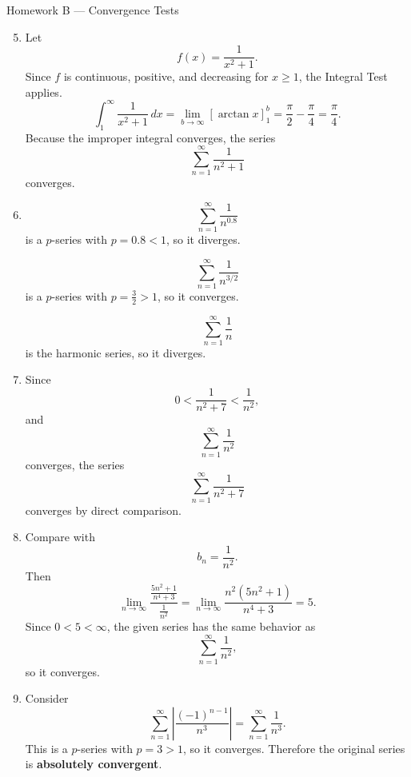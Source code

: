 \documentclass[11pt]{article}
\begin{document}
\begin{theorybox}{Homework B --- Convergence Tests}
\begin{enumerate}
\setcounter{enumi}{4}
    \item
    Let
    \[
    f(x)=\frac{1}{x^2+1}.
    \]
    Since \(f\) is continuous, positive, and decreasing for \(x\ge 1\), the Integral Test applies.
    \[
    \int_1^{\infty}\frac{1}{x^2+1}\,dx
    =
    \lim_{b\to\infty}[\arctan x]_1^b
    =
    \frac{\pi}{2}-\frac{\pi}{4}
    =
    \frac{\pi}{4}.
    \]
    Because the improper integral converges, the series
    \[
    \sum_{n=1}^{\infty}\frac{1}{n^2+1}
    \]
    converges.

    \item
    \[
    \sum_{n=1}^{\infty}\frac{1}{n^{0.8}}
    \]
    is a \(p\)-series with \(p=0.8<1\), so it diverges.

    \[
    \sum_{n=1}^{\infty}\frac{1}{n^{3/2}}
    \]
    is a \(p\)-series with \(p=\frac32>1\), so it converges.

    \[
    \sum_{n=1}^{\infty}\frac{1}{n}
    \]
    is the harmonic series, so it diverges.

    \item
    Since
    \[
    0<\frac{1}{n^2+7}<\frac{1}{n^2},
    \]
    and
    \[
    \sum_{n=1}^{\infty}\frac{1}{n^2}
    \]
    converges, the series
    \[
    \sum_{n=1}^{\infty}\frac{1}{n^2+7}
    \]
    converges by direct comparison.

    \item
    Compare with
    \[
    b_n=\frac{1}{n^2}.
    \]
    Then
    \[
    \lim_{n\to\infty}
    \frac{\frac{5n^2+1}{n^4+3}}{\frac{1}{n^2}}
    =
    \lim_{n\to\infty}\frac{n^2(5n^2+1)}{n^4+3}
    =
    5.
    \]
    Since \(0<5<\infty\), the given series has the same behavior as
    \[
    \sum_{n=1}^{\infty}\frac{1}{n^2},
    \]
    so it converges.

    \item
    Consider
    \[
    \sum_{n=1}^{\infty}\left|\frac{(-1)^{n-1}}{n^3}\right|
    =
    \sum_{n=1}^{\infty}\frac{1}{n^3}.
    \]
    This is a \(p\)-series with \(p=3>1\), so it converges.
    Therefore the original series is \textbf{absolutely convergent}.
\end{enumerate}
\end{theorybox}
\end{document}
